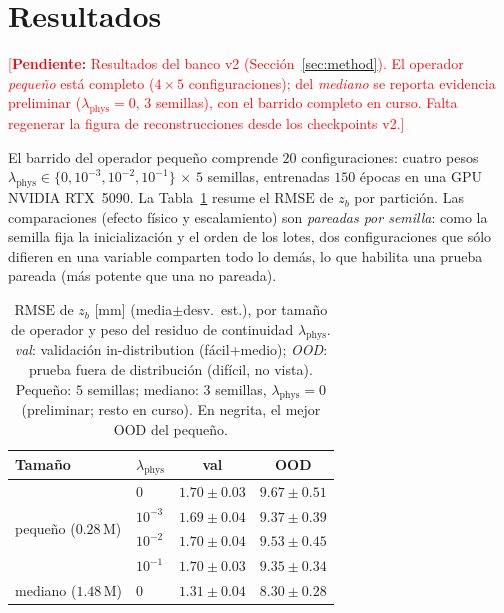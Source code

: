 \documentclass[conference]{IEEEtran}
\newcommand{\zb}{z_b}
\newcommand{\RMSE}{\mathrm{RMSE}}
\newcommand{\TODO}[1]{\textcolor{red}{[\textbf{Pendiente:} #1]}}
\begin{document}
\section{Resultados}
\label{sec:results}

\TODO{Resultados del banco v2 (Sección~\ref{sec:method}). El operador
\emph{pequeño} está completo ($4\times5$ configuraciones); del \emph{mediano}
se reporta evidencia preliminar ($\lambda_{\text{phys}}=0$, $3$ semillas), con
el barrido completo en curso. Falta regenerar la figura de reconstrucciones
desde los checkpoints v2.}

El barrido del operador pequeño comprende $20$ configuraciones: cuatro pesos
$\lambda_{\text{phys}}\in\{0,10^{-3},10^{-2},10^{-1}\}$ $\times$ $5$ semillas,
entrenadas $150$ épocas en una GPU NVIDIA RTX~5090. La Tabla~\ref{tab:results}
resume el $\RMSE$ de $\zb$ por partición. Las comparaciones (efecto físico y
escalamiento) son \emph{pareadas por semilla}: como la semilla fija la
inicialización y el orden de los lotes, dos configuraciones que sólo difieren
en una variable comparten todo lo demás, lo que habilita una prueba pareada
(más potente que una no pareada).

\begin{table}[t]
\centering
\caption{$\RMSE$ de $\zb$ [mm] (media$\pm$desv.\ est.), por tamaño de operador
y peso del residuo de continuidad $\lambda_{\text{phys}}$. \emph{val}:
validación in-distribution (fácil+medio); \emph{OOD}: prueba fuera de
distribución (difícil, no vista). Pequeño: $5$ semillas; mediano: $3$ semillas,
$\lambda_{\text{phys}}=0$ (preliminar; resto en curso). En negrita, el mejor
OOD del pequeño.}
\label{tab:results}
\begin{tabular}{llcc}
\toprule
Tamaño & $\lambda_{\text{phys}}$ & val & OOD \\
\midrule
\multirow{4}{*}{pequeño ($0.28$\,M)}
 & $0$       & $1.70\pm0.03$ & $9.67\pm0.51$ \\
 & $10^{-3}$ & $1.69\pm0.04$ & $9.37\pm0.39$ \\
 & $10^{-2}$ & $1.70\pm0.04$ & $9.53\pm0.45$ \\
 & $10^{-1}$ & $1.70\pm0.03$ & $\mathbf{9.35\pm0.34}$ \\
\midrule
mediano ($1.48$\,M) & $0$ & $1.31\pm0.04$ & $8.30\pm0.28$ \\
\bottomrule
\end{tabular}
\end{table}
\end{document}
